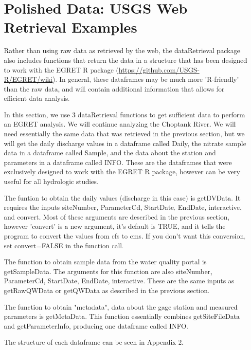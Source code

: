 \documentclass[a4paper,11pt]{article}
\begin{document}
\section{Polished Data: USGS Web Retrieval Examples}
Rather than using raw data as retrieved by the web, the dataRetrieval package also includes functions that return the data in a structure that has been designed to work with the EGRET R package (\url{https://github.com/USGS-R/EGRET/wiki}). In general, these dataframes may be much more 'R-friendly' than the raw data, and will contain additional information that allows for efficient data analysis.

In this section, we use 3 dataRetrieval functions to get sufficient data to perform an EGRET analysis.  We will continue analyzing the Choptank River. We will need essentially the same data that was retrieved in the previous section, but we will get the daily discharge values in a dataframe called Daily, the nitrate sample data in a dataframe called Sample, and the data about the station and parameters in a dataframe called INFO. These are the dataframes that were exclusively designed to work with the EGRET R package, however can be very useful for all hydrologic studies.

The funtion to obtain the daily values (discharge in this case) is getDVData.  It requires the inputs siteNumber, ParameterCd, StartDate, EndDate, interactive, and convert. Most of these arguments are described in the previous section, however 'convert' is a new argument, it's default is TRUE, and it tells the program to convert the values from cfs to cms. If you don't want this conversion, set convert=FALSE in the function call.

The function to obtain sample data from the water quality portal is getSampleData. The arguments for this function are also siteNumber, ParameterCd, StartDate, EndDate, interactive. These are the same inputs as getRawQWData or getQWData as described in the previous section.

The function to obtain "metadata", data about the gage station and measured parameters is getMetaData. This function essentially combines getSiteFileData and getParameterInfo, producing one dataframe called INFO.

The structure of each dataframe can be seen in Appendix 2.
\end{document}

